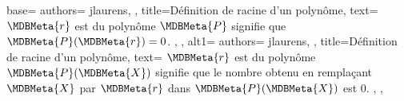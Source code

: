 {
  base={
    authors={
      jlaurens,
    },
    title=Définition de racine d'un polynôme,
    text={
\(\MDBMeta{r}\) est  du polynôme \(\MDBMeta{P}\) signifie que \(\MDBMeta{P}(\MDBMeta{r})=0\).
    },
  },
  alt1={
    authors={
      jlaurens,
    },
    title=Définition de racine d'un polynôme,
    text={
\(\MDBMeta{r}\) est  du polynôme \(\MDBMeta{P}(\MDBMeta{X})\) signifie que le nombre obtenu en remplaçant \(\MDBMeta{X}\) par \(\MDBMeta{r}\) dans \(\MDBMeta{P}(\MDBMeta{X})\) est \(0\).
    },
  },
}
